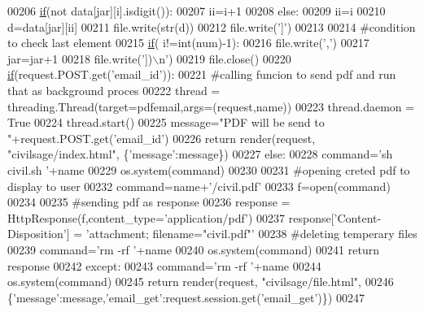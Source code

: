 \begin{DoxyCode}
00206                 \hyperlink{bootstrap_8min_8js_ac2d69f5011896c6ed4a54e0dd36f6334}{if}(\textcolor{keywordflow}{not} data[jar][i].isdigit()):
00207                     ii=i+1
00208                 \textcolor{keywordflow}{else}:
00209                     ii=i
00210                 d=data[jar][ii]
00211                 file.write(str(d))
00212                 file.write(\textcolor{stringliteral}{']'})
00213 
00214                 \textcolor{comment}{#condition to check last element}
00215                 \hyperlink{bootstrap_8min_8js_ac2d69f5011896c6ed4a54e0dd36f6334}{if}( i!=int(num)-1):
00216                     file.write(\textcolor{stringliteral}{','})
00217             jar=jar+1
00218             file.write(\textcolor{stringliteral}{'])\(\backslash\)n'})
00219         file.close()
00220         \hyperlink{bootstrap_8min_8js_ac2d69f5011896c6ed4a54e0dd36f6334}{if}(request.POST.get(\textcolor{stringliteral}{'email\_id'})):
00221             \textcolor{comment}{#calling funcion to send pdf and run that as background proces}
00222             thread = threading.Thread(target=pdfemail,args=(request,name))
00223             thread.daemon = \textcolor{keyword}{True}
00224             thread.start()
00225             message=\textcolor{stringliteral}{"PDF will be send to "}+request.POST.get(\textcolor{stringliteral}{'email\_id'})
00226             \textcolor{keywordflow}{return} render(request, \textcolor{stringliteral}{"civilsage/index.html"}, \{\textcolor{stringliteral}{'message'}:message\})
00227         \textcolor{keywordflow}{else}:
00228             command=\textcolor{stringliteral}{'sh  civil.sh '}+name
00229             os.system(command)
00230 
00231             \textcolor{comment}{#opening creted pdf to display to user}
00232             command=name+\textcolor{stringliteral}{'/civil.pdf'}
00233             f=open(command)
00234 
00235             \textcolor{comment}{#sending pdf as response}
00236             response = HttpResponse(f,content\_type=\textcolor{stringliteral}{'application/pdf'})
00237             response[\textcolor{stringliteral}{'Content-Disposition'}] = \textcolor{stringliteral}{'attachment; filename="civil.pdf"'}
00238             \textcolor{comment}{#deleting temperary files}
00239             command=\textcolor{stringliteral}{'rm -rf '}+name
00240             os.system(command)
00241             \textcolor{keywordflow}{return} response
00242     \textcolor{keywordflow}{except}:
00243         command=\textcolor{stringliteral}{'rm -rf '}+name
00244         os.system(command)
00245         \textcolor{keywordflow}{return} render(request, \textcolor{stringliteral}{"civilsage/file.html"},
00246         \{\textcolor{stringliteral}{'message'}:message,\textcolor{stringliteral}{'email\_get'}:request.session.get(\textcolor{stringliteral}{'email\_get'})\})
00247 
\end{DoxyCode}


